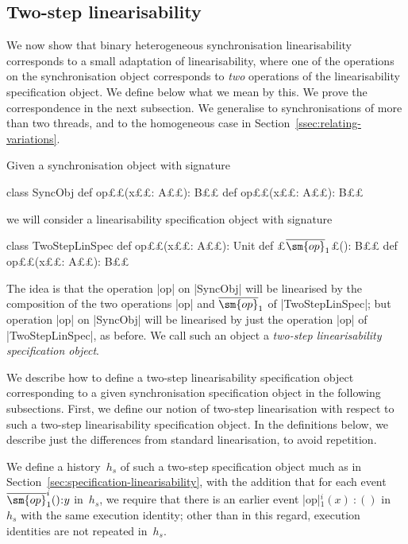 
\subsection{Two-step linearisability}

We now show that binary heterogeneous synchronisation linearisability
corresponds to a small adaptation of linearisability, where one of the
operations on the synchronisation object corresponds to \emph{two} operations
of the linearisability specification object.  We define below what we mean by
this.  We prove the correspondence in the next subsection.  We generalise to
synchronisations of more than two threads, and to the homogeneous case in
Section~\ref{ssec:relating-variations}.  

Given a synchronisation object with signature
\begin{scala}
class SyncObj{
  def op££(x££: A££): B££
  def op££(x££: A££): B££
}
\end{scala}
we will consider a linearisability specification object with signature
%
\begin{scala}
class TwoStepLinSpec{
  def op££(x££: A££): Unit
  def £$\overline{\sm{op}}_1$£(): B££
  def op££(x££: A££): B££
}
\end{scala}
%
The idea is that the operation |op| on |SyncObj| will be linearised by the
composition of the two operations |op| and $\overline{\sm{op}}_1$ of
|TwoStepLinSpec|; but operation |op| on |SyncObj| will be linearised by
just the operation |op| of |TwoStepLinSpec|, as before.  We call such an
object a \emph{two-step linearisability specification object}.  

We describe how to define a two-step linearisability specification object
corresponding to a given synchronisation specification object in the following
subsections.  First, we define our notion of two-step linearisation with
respect to such a two-step linearisability specification object.  In the
definitions below, we describe just the differences from standard
linearisation, to avoid repetition.

We define a history~$h_s$ of such a
two-step specification object much as in
Section~\ref{sec:specification-linearisability}, with the addition that for
each event $\overline{\sm{op}}_1^i()\::y$ in~$h_s$, we require that there is
an earlier event |op|$_1^i(x)\::()$ in~$h_s$ with the same execution
identity; other than in this regard, execution identities are not repeated
in~$h_s$.

